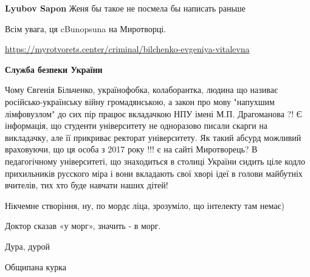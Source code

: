\begin{itemize}
\begin{itemize}
\textbf{Lyubov Sapon} Женя бы такое не посмела бы написать раньше

\end{itemize}


Всім увага, ця cBunopsuna на Миротворці.

\url{https://myrotvorets.center/criminal/bilchenko-evgeniya-vitalevna}

\begin{itemize}

\textbf{Служба безпеки України}

Чому Євгенія Більченко, українофобка, колаборантка, людина що називає
російсько-українську війну громадянською, а закон про мову "напухшим
лімфовузлом" до сих пір працює вкладачкою НПУ імені М.П. Драгоманова ?! Є
інформація, що студенти університету не одноразово писали скарги на викладачку,
але її прикриває ректорат університету. Як такий абсурд можливий враховуючи, що
ця особа з 2017 року !!! є на сайті Миротворець? В педагогічному університеті,
що знаходиться в столиці України сидить ціле кодло прихильників русского міра і
вони вкладають свої хворі ідеї в голови майбутніх вчителів, тих хто буде
навчати наших дітей!

\end{itemize}


Нікчемне створіння, ну, по мордє ліца, зрозуміло, що інтелекту там немає)


Доктор сказав «у морг», значить - в морг.


Дура, дурой


Общипана курка


\end{itemize}
